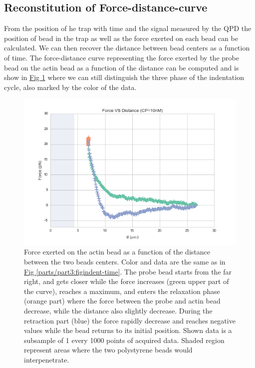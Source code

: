 \documentclass[A4paperpaper,11pt,english]{sphinxmanual}
\begin{document}
\subsection{Reconstitution of Force-distance-curve}
\label{parts/part3:reconstitution-of-force-distance-curve}
From the position of he trap with time and the signal measured by the QPD the
position of bead in the trap as well as the force exerted on each bead can be
calculated. We can then recover the distance between bead centers as a function
of time.  The force-distance curve representing the force exerted by the
probe bead on the actin bead as a function of the distance can be computed and is
show in \hyperref[parts/part3:force-distance]{Fig  \ref*{parts/part3:force-distance}} where we can still distinguish the three
phase of the indentation cycle, also marked by the color of the data.
\begin{figure}[htbp]
\centering
\capstart

\includegraphics[width=1.000\linewidth]{force-distance.png}
\caption{Force exerted on the actin bead as a function of the distance between the
two beads centers. Color and data are the same as in \hyperref[parts/part3:figindent-time]{Fig  \ref*{parts/part3:figindent-time}}.
The probe bead starts from the far right, and gets closer
while the force increases (green upper part of the curve), reaches a
maximum, and enters the relaxation phase (orange part) where the force
between the probe and actin bead decrease, while the distance  also
slightly decrease. During the retraction part (blue) the force rapidly
decrease and  reaches negative values while the bead returns to its initial
position. Shown data is a subsample of 1 every 1000 points of acquired
data. Shaded region represent areas where the two polystyrene beads would
interpenetrate.}\label{parts/part3:force-distance}\end{figure}
\end{document}

